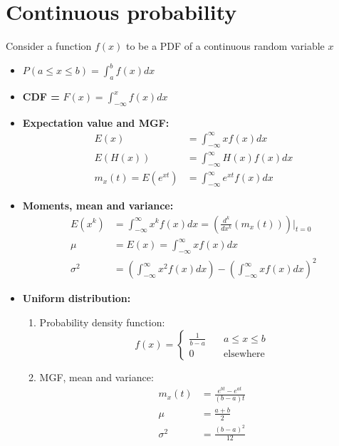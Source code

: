 \documentclass[a4paper]{article}
\begin{document}
\section{Continuous probability}
Consider a function $f(x)$ to be a PDF of a continuous random variable $x$
\begin{itemize}
    \item $P(a\leq x\leq b) = \int_{a}^{b}f(x)dx$
    \item \textbf{CDF = }$F(x) = \int_{-\infty}^{x}f(x)dx$
    \item \textbf{Expectation value and MGF:}
    \begin{align*}
    E(x) &= \int_{-\infty}^{\infty}xf(x)dx\\
    E(H(x)) &= \int_{-\infty}^{\infty}H(x)f(x)dx\\
    m_x(t) = E(e^{xt}) &= \int_{-\infty}^{\infty} e^{xt}f(x)dx
    \end{align*}
    \item \textbf{Moments, mean and variance:}
    \begin{align*}
        E(x^k) &= \int_{-\infty}^{\infty} x^kf(x)dx = \left(\frac{d^k}{dx^k}\left(m_x(t)\right)\right)\biggr\rvert_{t = 0}\\
        \mu &= E(x) = \int_{-\infty}^{\infty} xf(x)dx\\
        \sigma^2 &= \left(\int_{-\infty}^{\infty} x^2f(x)dx\right) - \left(\int_{-\infty}^{\infty} xf(x)dx\right)^2
    \end{align*}
    \item \textbf{Uniform distribution:\\ }
    \begin{enumerate}
        \item Probability density function:
                \begin{equation*}
                    f(x) = \begin{cases}
                    \frac{1}{b-a}\quad & a\leq x\leq b\\
                    0\quad &\text{elsewhere}
                    \end{cases}
                \end{equation*}
        \item MGF, mean and variance:
    \begin{align*}
        m_x(t) &= \frac{e^{bt}-e^{at}}{(b-a)t}\\
        \mu &= \frac{a+b}{2}\\
        \sigma^2 &= \frac{(b-a)^2}{12}
    \end{align*}

\end{enumerate}
\end{itemize}
\end{document}
